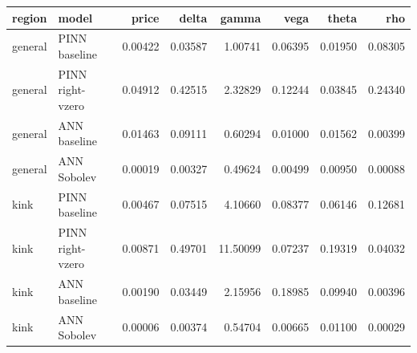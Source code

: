 \begin{tabular}{llrrrrrr}
\toprule
region & model & price & delta & gamma & vega & theta & rho \\
\midrule
general & PINN baseline & 0.00422 & 0.03587 & 1.00741 & 0.06395 & 0.01950 & 0.08305 \\
general & PINN right-vzero & 0.04912 & 0.42515 & 2.32829 & 0.12244 & 0.03845 & 0.24340 \\
general & ANN baseline & 0.01463 & 0.09111 & 0.60294 & 0.01000 & 0.01562 & 0.00399 \\
general & ANN Sobolev & 0.00019 & 0.00327 & 0.49624 & 0.00499 & 0.00950 & 0.00088 \\
kink & PINN baseline & 0.00467 & 0.07515 & 4.10660 & 0.08377 & 0.06146 & 0.12681 \\
kink & PINN right-vzero & 0.00871 & 0.49701 & 11.50099 & 0.07237 & 0.19319 & 0.04032 \\
kink & ANN baseline & 0.00190 & 0.03449 & 2.15956 & 0.18985 & 0.09940 & 0.00396 \\
kink & ANN Sobolev & 0.00006 & 0.00374 & 0.54704 & 0.00665 & 0.01100 & 0.00029 \\
\bottomrule
\end{tabular}
